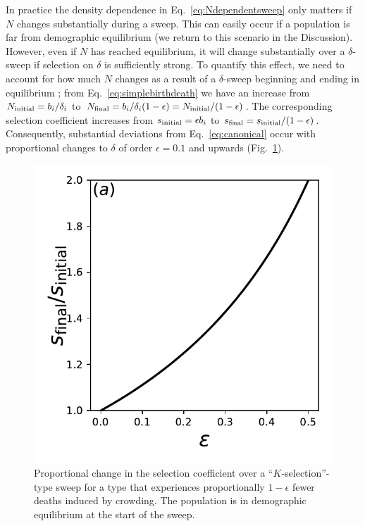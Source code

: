 \documentclass[11pt]{article}
\begin{document}
In practice the density dependence in Eq.~\eqref{eq:Ndependentsweep} only matters if $N$ changes substantially during a sweep. This can easily occur if a population is far from demographic equilibrium (we return to this scenario in the Discussion). However, even if $N$ has reached equilibrium, it will change substantially over a $\delta$-sweep if selection on $\delta$ is sufficiently strong. To quantify this effect, we need to account for how much $N$ changes as a result of a $\delta$-sweep beginning and ending in equilibrium \citep{kimura1969natural}; from Eq.~\eqref{eq:simplebirthdeath} we have an increase from $N_{\rm initial}=b_i/\delta_i$ to $N_{\rm final}=b_i/\delta_i(1-\epsilon)=N_{\rm initial}/(1-\epsilon)$. The corresponding selection coefficient increases from $s_{\rm initial}= \epsilon b_i$ to $s_{\rm final}=s_{\rm initial}/(1-\epsilon)$. Consequently, substantial deviations from Eq.~\eqref{eq:canonical} occur with proportional changes to $\delta$ of order $\epsilon=0.1$ and upwards (Fig.~\ref{fig:strengthofselection}). 

\begin{figure}
\centering
\includegraphics[scale=0.8]{strengthofselection.pdf}
\caption{\label{fig:strengthofselection} Proportional change in the selection coefficient over a ``$K$-selection''-type sweep for a type that experiences proportionally $1-\epsilon$ fewer deaths induced by crowding. The population is in demographic equilibrium at the start of the sweep.}
\end{figure}
\end{document}
